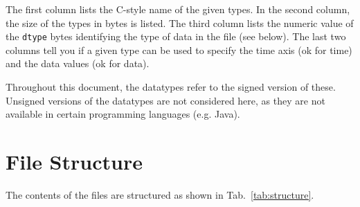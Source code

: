 \documentclass[a4paper,10pt]{article}
\begin{document}
The first column lists the C-style name of the given types.
In the second column, the size of the types in bytes is listed.
The third column lists the numeric value of the \texttt{dtype} bytes identifying the type of data in the file (see below).
The last two columns tell you if a given type can be used to specify the time axis (ok for time)
and the data values (ok for data).

Throughout this document, the datatypes refer to the signed version of these. Unsigned versions of the datatypes are not
considered here, as they are not available in certain programming languages (e.g. Java).

\section{File Structure}
The contents of the files are structured as shown in Tab.~\ref{tab:structure}.
\end{document}
